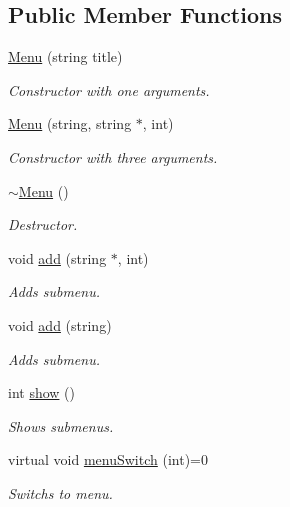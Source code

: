 \subsection*{Public Member Functions}
\begin{DoxyCompactItemize}
\item 
\mbox{\label{classMenu_a3377fd5036a2f8f93eee473afd570185}} 
\hyperlink{classMenu_a3377fd5036a2f8f93eee473afd570185}{Menu} (string title)
\begin{DoxyCompactList}\small\item\em Constructor with one arguments. \end{DoxyCompactList}\item 
\hyperlink{classMenu_a28dcf937389ad94a178caef7b28a11a8}{Menu} (string, string $\ast$, int)
\begin{DoxyCompactList}\small\item\em Constructor with three arguments. \end{DoxyCompactList}\item 
\hyperlink{classMenu_a831387f51358cfb88cd018e1777bc980}{$\sim$\+Menu} ()
\begin{DoxyCompactList}\small\item\em Destructor. \end{DoxyCompactList}\item 
void \hyperlink{classMenu_a2be45a29dd0fa643d5fc118350bce944}{add} (string $\ast$, int)
\begin{DoxyCompactList}\small\item\em Adds submenu. \end{DoxyCompactList}\item 
void \hyperlink{classMenu_a5423c0d700c20bf8bdd0fb1dbf0c0f6f}{add} (string)
\begin{DoxyCompactList}\small\item\em Adds submenu. \end{DoxyCompactList}\item 
int \hyperlink{classMenu_a346009151f57e18ffe0fa5a9dd89b1d6}{show} ()
\begin{DoxyCompactList}\small\item\em Shows submenus. \end{DoxyCompactList}\item 
\mbox{\label{classMenu_ae9d7af36b1a380e5e4b03ddbef9ceeca}} 
virtual void \hyperlink{classMenu_ae9d7af36b1a380e5e4b03ddbef9ceeca}{menu\+Switch} (int)=0
\begin{DoxyCompactList}\small\item\em Switchs to menu. \end{DoxyCompactList}\end{DoxyCompactItemize}
